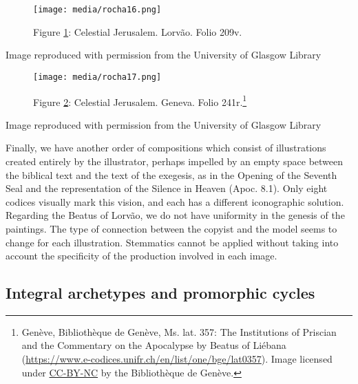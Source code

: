\documentclass{article}
\begin{document}
\begin{figure}[H]
    \centering
    \texttt{[image: media/rocha16.png]}
    \caption{Figure \ref{fig:rocha:celestial-lorvao}: Celestial Jerusalem. Lorvão. Folio 209v.}
    \label{fig:rocha:celestial-lorvao}
\end{figure}


 Image reproduced with permission from the University of Glasgow Library 


 
  \begin{figure}
    \centering
    \texttt{[image: media/rocha17.png]}
    \caption{Figure \ref{fig:rocha:celestial-geneva}: Celestial Jerusalem. Geneva. Folio 241r.\footnote{Genève, Bibliothèque de Genève, Ms. lat. 357: The Institutions of Priscian and the Commentary on the Apocalypse by Beatus of Liébana (\url{https://www.e-codices.unifr.ch/en/list/one/bge/lat0357}). Image licensed under \href{https://creativecommons.org/licenses/by-nc/4.0/deed.en}{CC-BY-NC} by the Bibliothèque de Genève.}}
    \label{fig:rocha:celestial-geneva}
\end{figure}


 Image reproduced with permission from the University of Glasgow Library 


 
Finally, we have another order of compositions which consist of
illustrations created entirely by the illustrator, perhaps impelled by
an empty space between the biblical text and the text of the exegesis,
as in the Opening of the Seventh Seal and the representation of the
Silence in Heaven (Apoc. 8.1). Only eight codices visually mark this
vision, and each has a different iconographic solution. Regarding the
Beatus of Lorvão, we do not have uniformity in the genesis of the
paintings. The type of connection between the copyist and the model
seems to change for each illustration. Stemmatics cannot be applied
without taking into account the specificity of the production involved
in each image.

\subsection*{Integral archetypes and promorphic cycles}
\end{document}
